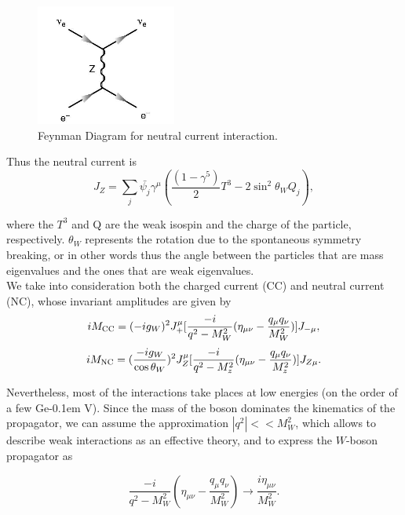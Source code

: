 \documentclass[10pt,swedish, openany]{book}
\def\GeV{\ifmmode {\mathrm{\ Ge\kern -0.1em V}}\else
                   \textrm{Ge\kern -0.1em V}\fi}%
\begin{document}
\begin{figure}[h]
\includegraphics[scale=0.8]{neutral.png}
\centering
\caption{Feynman Diagram for neutral current interaction.}
\label{fig:ZInteraction}
\end{figure}  

Thus the neutral current is
\begin{equation}
    J_Z = \sum_j \bar{\psi_j}\gamma^{\mu} (\frac{(1-\gamma^5)}{2}T^3 - 2\sin^2{\theta_W}Q_j), 
\end{equation}

where the $T^3$ and Q are the weak isospin and the charge of the particle, respectively. $\theta_W$ represents the rotation due to the spontaneous symmetry breaking, or in other words thus the angle between the particles that are mass eigenvalues and the ones that are weak eigenvalues.\\

We take into consideration both the charged current (CC) and neutral current (NC), whose invariant amplitudes are given by
\begin{equation}
    i M_{\rm CC} = (-i g_W)^2 J^{\mu}_+ [\frac{-i}{q^2-M^2_W}(\eta_{\mu\nu}-\frac{q_{\mu}q_{\nu}}{M^2_W})] J_{- \mu},
\end{equation}
\begin{equation}
    i M_{\rm NC} = (\frac{-i g_W}{\cos{\theta_W}})^2 J^{\mu}_Z [\frac{-i}{q^2-M^2_z}(\eta_{\mu\nu}-\frac{q_{\mu}q_{\nu}}{M^2_z})] J_{Z \mu}.
\end{equation}

Nevertheless, most of the interactions take places at low energies (on the order of a few \GeV). Since the mass of the boson dominates the kinematics of the propagator, we can assume the approximation $|q^2| << M^2_W$, which allows to describe weak interactions as an effective theory, and to express the $W$-boson propagator as

\begin{equation}
    \frac{-i}{q^2-M^2_W}(\eta_{\mu\nu}-\frac{q_{\mu}q_{\nu}}{M^2_W}) \rightarrow \frac{i \eta_{\mu\nu}}{M^2_W}.
\end{equation}
\end{document}
